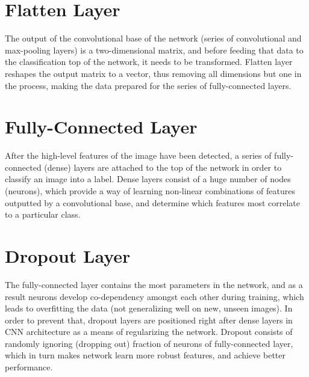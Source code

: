 \section{Flatten Layer}

The output of the convolutional base of the network (series of convolutional and max-pooling layers) is a two-dimensional matrix, and before feeding that data to the classification top of the network, it needs to be transformed. Flatten layer reshapes the output matrix to a vector, thus removing all dimensions but one in the process, making the data prepared for the series of fully-connected layers.

\section{Fully-Connected Layer}

After the high-level features of the image have been detected, a series of fully-connected (dense) layers are attached to the top of the network in order to classify an image into a label. Dense layers consist of a huge number of nodes (neurons), which provide a way of learning non-linear combinations of features outputted by a convolutional base, and determine which features most correlate to a particular class.

\section{Dropout Layer}

The fully-connected layer contains the most parameters in the network, and as a result neurons develop co-dependency amongst each other during training, which leads to overfitting the data (not generalizing well on new, unseen images). In order to prevent that, dropout layers are positioned right after dense layers in CNN architecture as a means of regularizing the network. Dropout consists of randomly ignoring (dropping out) fraction of neurons of fully-connected layer, which in turn makes network learn more robust features, and achieve better performance.
\clearpage
